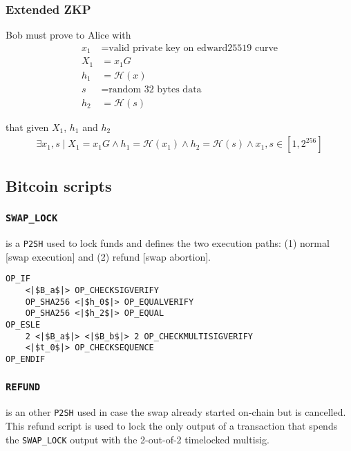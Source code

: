 \documentclass{llncs}
\begin{document}
\subsubsection{Extended ZKP}
Bob must prove to Alice with
\begin{equation}
\begin{split}
    x_1 &= \text{valid private key on edward25519 curve} \\
    X_1 &= x_1G \\
    h_1 &= \mathcal{H}(x) \\
    s &= \text{random 32 bytes data} \\
    h_2 &= \mathcal{H}(s)
\end{split}
\end{equation}

that given $X_1$, $h_1$ and $h_2$
\begin{equation}
\begin{split}
    \exists x_1, s \mid X_1 = x_1G \land h_1 = \mathcal{H}(x_1) \land h_2 = \mathcal{H}(s) \land x_1, s \in [1, 2^{256}]
\end{split}
\end{equation}

\subsection{Bitcoin scripts}

\subsubsection{\texttt{SWAP\_LOCK}}
is a \texttt{P2SH} used to lock funds and defines the two execution paths: (1) normal [swap execution] and (2) refund [swap abortion].

\begin{verbatim}
OP_IF
    <|$B_a$|> OP_CHECKSIGVERIFY
    OP_SHA256 <|$h_0$|> OP_EQUALVERIFY
    OP_SHA256 <|$h_2$|> OP_EQUAL
OP_ESLE
    2 <|$B_a$|> <|$B_b$|> 2 OP_CHECKMULTISIGVERIFY
    <|$t_0$|> OP_CHECKSEQUENCE
OP_ENDIF
\end{verbatim}

\subsubsection{\texttt{REFUND}}
is an other \texttt{P2SH} used in case the swap already started on-chain but is cancelled. This refund script is used to lock the only output of a transaction that spends the \texttt{SWAP\_LOCK} output with the 2-out-of-2 timelocked multisig.
\end{document}
